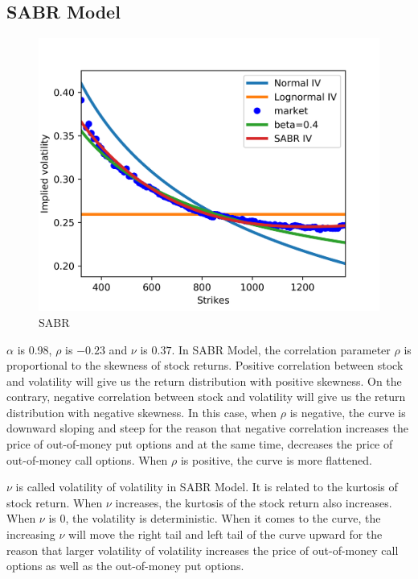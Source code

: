 \documentclass[fleqn,12pt]{SelfArx}
\begin{document}
\subsection{SABR Model}

\begin{figure}[ht]\centering
	\includegraphics{SABR}
	\caption{SABR}
\end{figure}

\noindent $\alpha$ is 0.98, $\rho$ is $-0.23$ and $\nu$ is $0.37$. In SABR Model, the correlation parameter $\rho$ is proportional to the skewness of stock returns. Positive correlation between stock and volatility will give us the return distribution with positive skewness. On the contrary, negative correlation between stock and volatility will give us the return distribution with negative skewness. In this case, when $\rho$ is negative, the curve is downward sloping and steep for the reason that negative correlation increases the price of out-of-money put options and at the same time, decreases the price of out-of-money call options. When $\rho$ is positive, the curve is more flattened. 

\noindent $\nu$ is called volatility of volatility in SABR Model. It is related to the kurtosis of stock return. When $\nu$ increases, the kurtosis of the stock return also increases. When $\nu$ is 0, the volatility is deterministic. When it comes to the curve, the increasing $\nu$ will move the right tail and left tail of the curve upward for the reason that larger volatility of volatility increases the price of out-of-money call options as well as the out-of-money put options. 
\end{document}
